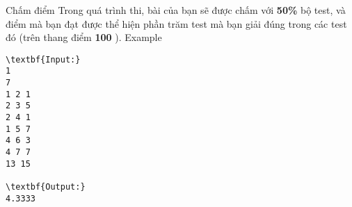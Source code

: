 Chấm điểm
Trong quá trình thi, bài của bạn sẽ được chấm với   \textbf{    50\%   }   bộ test, và điểm mà bạn đạt được thể hiện phần trăm test mà bạn giải đúng trong các test đó (trên thang điểm   \textbf{    100   }   ).
Example
\begin{verbatim}
\textbf{Input:}
1
7
1 2 1
2 3 5
2 4 1
1 5 7
4 6 3
4 7 7
13 15

\textbf{Output:}
4.3333

\end{verbatim}